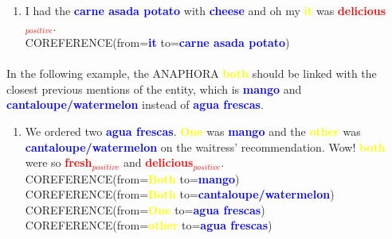 \documentclass{article}
\begin{document}
	
	
	


\begin{enumerate}[resume]
	\item I had the \textbf{\textcolor{blue}{carne asada potato}} with \textbf{\textcolor{blue}{cheese}} and oh my \textbf{\textcolor{yellow}{it}} was \textbf{\textcolor{red}{delicious$_{positive}$}}.\\
	
	
	\textsc{COREFERENCE}(from=\textbf{\textcolor{blue}{it}} to=\textbf{\textcolor{blue}{carne asada potato}}) \\
\end{enumerate}

\paragraph{}
In the following example, the ANAPHORA \textbf{\textcolor{yellow}{both}} should be linked with the closest previous mentions of the entity, which is \textbf{\textcolor{blue}{mango}} and \textbf{\textcolor{blue}{cantaloupe/watermelon}} instead of \textbf{\textcolor{blue}{agua frescas}}.

\begin{enumerate}[resume]
	\item We ordered two \textbf{\textcolor{blue}{agua frescas}}. \textbf{\textcolor{yellow}{One}} was  \textbf{\textcolor{blue}{mango}} and the \textbf{\textcolor{yellow}{other}} was 
	\textbf{\textcolor{blue}{cantaloupe/watermelon}} on the waitress' recommendation. Wow! 
	\textbf{\textcolor{yellow}{both}} were so 
	\textbf{\textcolor{red}{fresh$_{positive}$}} and 
	\textbf{\textcolor{red}{delicious$_{positive}$}}.\\
	
	\textsc{COREFERENCE}(from=\textbf{\textcolor{yellow}{Both}} to=\textbf{\textcolor{blue}{mango}}) \\
	\textsc{COREFERENCE}(from=\textbf{\textcolor{yellow}{Both}} to=\textbf{\textcolor{blue}{cantaloupe/watermelon}}) \\
	\textsc{COREFERENCE}(from=\textbf{\textcolor{yellow}{One}} to=\textbf{\textcolor{blue}{agua frescas}}) \\
	\textsc{COREFERENCE}(from=\textbf{\textcolor{yellow}{other}} to=\textbf{\textcolor{blue}{agua frescas}}) \\	
\end{enumerate}
\end{document}
